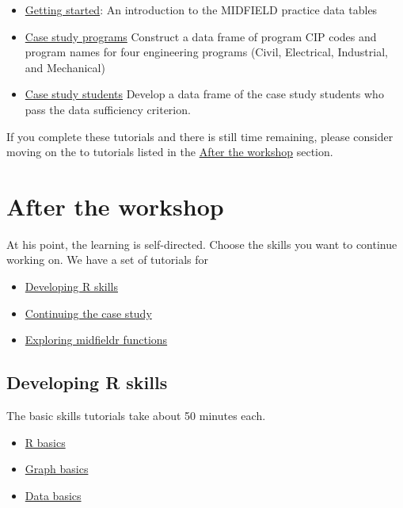 \documentclass[
]{book}
\providecommand{\tightlist}{%
  \setlength{\itemsep}{0pt}\setlength{\parskip}{0pt}}
\begin{document}
\begin{itemize}
\tightlist
\item
  \href{https://midfieldr.github.io/midfieldr/articles/art-000-getting-started.html}{Getting started}: An introduction to the MIDFIELD practice data tables\\
\item
  \href{https://midfieldr.github.io/midfieldr/articles/art-110-case-study-programs.html}{Case study programs} Construct a data frame of program CIP codes and program names for four engineering programs (Civil, Electrical, Industrial, and Mechanical)
\item
  \href{https://midfieldr.github.io/midfieldr/articles/art-120-case-study-students.html}{Case study students} Develop a data frame of the case study students who pass the data sufficiency criterion.
\end{itemize}

If you complete these tutorials and there is still time remaining, please consider moving on the to tutorials listed in the \protect\hyperlink{after-the-workshop}{After the workshop} section.

\hypertarget{after-the-workshop}{%
\section{After the workshop}\label{after-the-workshop}}

At his point, the learning is self-directed. Choose the skills you want to continue working on. We have a set of tutorials for

\begin{itemize}
\tightlist
\item
  \protect\hyperlink{developing-r-skills}{Developing R skills}
\item
  \protect\hyperlink{continuing-the-case-study}{Continuing the case study}
\item
  \protect\hyperlink{exploring-midfieldr-functions}{Exploring midfieldr functions}
\end{itemize}

\hypertarget{developing-r-skills}{%
\subsection{Developing R skills}\label{developing-r-skills}}

The basic skills tutorials take about 50 minutes each.

\begin{itemize}
\tightlist
\item
  \protect\hyperlink{r-basics}{R basics}
\item
  \protect\hyperlink{graph-basics}{Graph basics}\\
\item
  \protect\hyperlink{data-basics}{Data basics}
\end{itemize}
\end{document}
